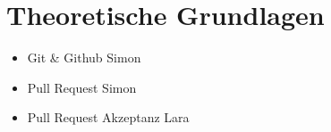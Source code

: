 


\chapter{Theoretische Grundlagen} %

\label{Chapter2} %

\begin{itemize}
    \item Git \& Github Simon
    \item Pull Request Simon
    \item Pull Request Akzeptanz Lara
\end{itemize}


